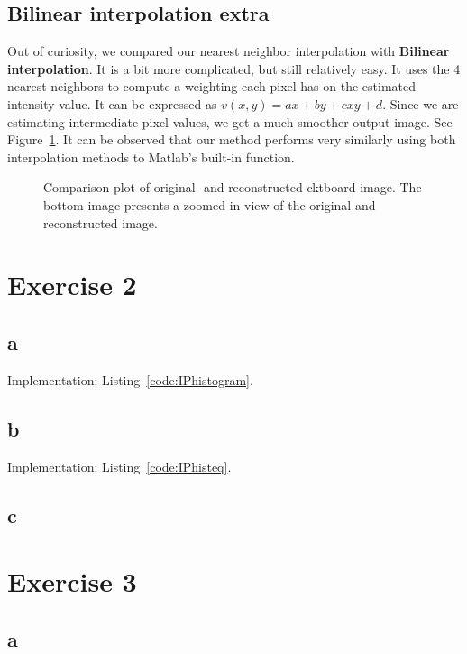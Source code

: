 \documentclass{article}
\begin{document}
\subsection*{Bilinear interpolation extra}
Out of curiosity, we compared our nearest neighbor interpolation with \textbf{Bilinear interpolation}. It is a bit more complicated, but still relatively easy. It uses the 4 nearest neighbors to compute a weighting each pixel has on the estimated intensity value. It can be expressed as $v(x, y) = ax + by + cxy + d$. Since we are estimating intermediate pixel values, we get a much smoother output image. See Figure~\ref{fig:bilinear}. It can be observed that our method performs very similarly using both interpolation methods to Matlab's built-in function.

\begin{figure}[ht]
    \centering
    
    
    \caption{Comparison plot of original- and reconstructed cktboard image. The bottom image presents a zoomed-in view of the original and reconstructed image.}
    \label{fig:bilinear}
\end{figure}

\section*{Exercise 2}
\subsection*{a}  Implementation: Listing~\ref{code:IPhistogram}.

\subsection*{b}  Implementation: Listing~\ref{code:IPhisteq}.

\subsection*{c}


\section*{Exercise 3}
\subsection*{a}
\end{document}
